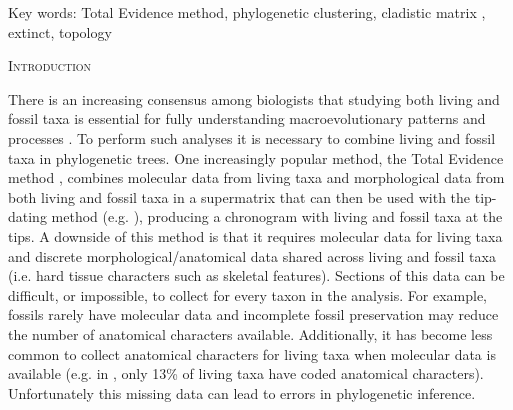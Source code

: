 \documentclass[12pt,letterpaper]{article}
\renewcommand{\section}[1]{%
\bigskip
\begin{center}
\begin{Large}
\normalfont\scshape #1
\medskip
\end{Large}
\end{center}}
\begin{document}
\noindent Key words: Total Evidence method, phylogenetic clustering, cladistic matrix%
, extinct, topology\\

\vspace{1.5in}

%
%
\newpage 
\section{Introduction}
There is an increasing consensus among biologists that studying both living and fossil taxa is essential for fully understanding macroevolutionary patterns and processes \cite{slaterunifying2013,fritzdiversity2013}.
To perform such analyses it is necessary to combine living and fossil taxa in phylogenetic trees.
One increasingly popular method, the Total Evidence method \cite{ronquista2012}, combines molecular data from living taxa and morphological data from both living and fossil taxa in a supermatrix that can then be used with the tip-dating method (e.g. \cite{pyrondivergence2011,ronquista2012,schragocombining2013,slaterunifying2013,beckancient2014}), producing a chronogram with living and fossil taxa at the tips.
A downside of this method is that it requires molecular data for living taxa and discrete morphological/anatomical data shared across living and fossil taxa (i.e. hard tissue characters such as skeletal features).
%
%
Sections of this data can be difficult, or impossible, to collect for every taxon in the analysis.
For example, fossils rarely have molecular data and incomplete fossil preservation may reduce the number of anatomical characters available. %
Additionally, it has become less common to collect anatomical characters for living taxa when molecular data is available (e.g. in \cite{slaterphylogenetic2013}, only 13\% of living taxa have coded anatomical characters).
Unfortunately this missing data can lead to errors in phylogenetic inference.
\end{document}
